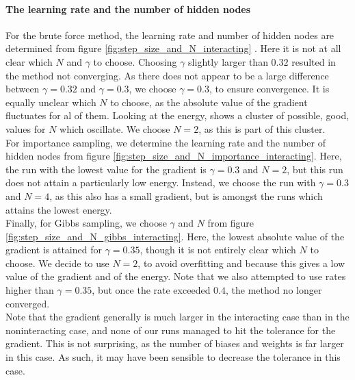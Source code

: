 \documentclass[a4paper, 10pt]{article}
\begin{document}
\paragraph{The learning rate and the number of hidden nodes}
For the brute force method, the learning rate and number of hidden nodes are determined from figure \ref{fig:step_size_and_N_interacting} . Here it is not at all clear which $N$ and $\gamma$ to choose. Choosing $\gamma$ slightly larger than $0.32$ resulted in the method not converging. As there does not appear to be a large difference between $\gamma=0.32$ and $\gamma=0.3$, we choose $\gamma=0.3$, to ensure convergence. It is equally unclear which $N$ to choose, as the absolute value of the gradient fluctuates for al of them. Looking at the energy, shows a cluster of possible, good, values for $N$ which oscillate. We choose $N=2$, as this is part of this cluster.\\
\linebreak
For importance sampling, we determine the learning rate and the number of hidden nodes from figure \ref{fig:step_size_and_N_importance_interacting}. Here, the run with the lowest value for the gradient is $\gamma=0.3$ and $N=2$, but this run does not attain a particularly low energy. Instead, we choose the run with $\gamma=0.3$ and $N=4$, as this also has a small gradient, but is amongst the runs which attains the lowest energy.\\
\linebreak
Finally, for Gibbs sampling, we choose $\gamma$ and $N$ from figure \ref{fig:step_size_and_N_gibbs_interacting}. Here, the lowest absolute value of the gradient is attained for $\gamma=0.35$, though it is not entirely clear which $N$ to choose. We decide to use $N=2$, to avoid overfitting and because this gives a low value of the gradient and of the energy. Note that we also attempted to use rates higher than $\gamma=0.35$, but once the rate exceeded $0.4$, the method no longer converged.\\
\linebreak
Note that the gradient generally is much larger in the interacting case than in the noninteracting case, and none of our runs managed to hit the tolerance for the gradient. This is not surprising, as the number of biases and weights is far larger in this case. As such, it may have been sensible to decrease the tolerance in this case.
\end{document}
